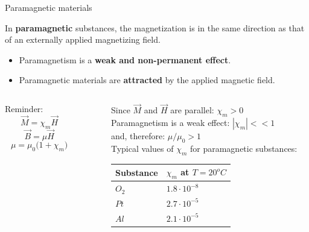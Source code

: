 \begin{frame}{Paramagnetic materials}

In {\bf paramagnetic} substances, the magnetization is in the same direction
as that of an externally applied magnetizing field.
\begin{itemize}
  \item Paramagnetism is a {\bf weak and non-permanent effect}.\\
  \item Paramagnetic materials are {\bf attracted} by the applied magnetic field.
\end{itemize}
\vspace{0.3cm}

\begin{columns}
  \begin{column}{0.25\textwidth}
   \begin{block}{}
     Reminder:
     \begin{equation*}
       \vec{M} = \chi_{m} \vec{H}
     \end{equation*}
     \begin{equation*}
       \vec{B} = \mu \vec{H}
     \end{equation*}
     \begin{equation*}
        \mu = \mu_0 \Big(1 + \chi_{m} \Big)
     \end{equation*}
   \end{block}
  \end{column}
  \begin{column}{0.05\textwidth}
  \end{column}
  \begin{column}{0.70\textwidth}
     Since $\vec{M}$ and $\vec{H}$ are parallel: $\chi_{m} > 0$\\
     \vspace{0.2cm}
     Paramagnetism is a weak effect: $|\chi_{m}| << 1$\\
     and, therefore: $\mu / \mu_{0} > 1$\\
     \vspace{0.2cm}
     Typical values of $\chi_m$ for paramagnetic substances:
     \begin{center}
       \begin{table}[H]
         \begin{tabular}{|l|l|}
         \hline
           Substance &  $\chi_m$ at $T=20^{o}C$ \\
         \hline
           $O_{2}$  & $1.8 \cdot 10^{-8}$ \\
           $Pt$     & $2.7 \cdot 10^{-5}$ \\
           $Al$     & $2.1 \cdot 10^{-5}$ \\
         \hline
         \end{tabular}
       \end{table}
     \end{center}
  \end{column}
\end{columns}

\end{frame}

